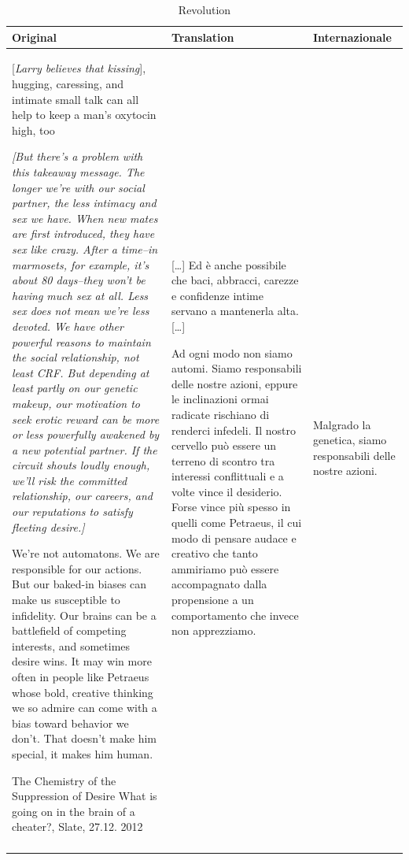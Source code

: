 \documentclass[output=paper]{LSP/langsci}
\begin{document}
\begin{table}
 \tiny
 \caption{Revolution}
 \label{troqe-marchan:tab:2}
\begin{tabularx}{\textwidth}{p{5cm}XX}
\lsptoprule
 Original & Translation & Internazionale \\
 \midrule{}
 [\textit{Larry believes that kissing}], hugging, caressing, and intimate small talk can all help to keep a man's oxytocin high, too

{\itshape [But there's a problem with this takeaway message. The longer we're with our social partner, the less intimacy and sex we have. When new mates are first introduced, they have sex like crazy. After a time--in marmosets, for example, it's about 80 days--they won't be having much sex at all.
Less sex does not mean we're less devoted. We have other powerful reasons to maintain the social relationship, not least CRF. But depending at least partly on our genetic makeup, our motivation to seek erotic reward can be more or less powerfully awakened by a new potential partner. If the circuit shouts loudly enough, we'll risk the committed relationship, our careers, and our reputations to satisfy fleeting desire.]}

We're not automatons. We are responsible for our actions. But our baked-in biases can make us susceptible to infidelity. Our brains can be a battlefield of competing interests, and sometimes desire wins. It may win more often in people like Petraeus whose bold, creative thinking we so admire can come with a bias toward behavior we don't. That doesn't make him special, it makes him human.

The Chemistry of the Suppression of Desire What is going on in the brain of a cheater?, Slate, 27.12. 2012 & 
[\ldots] Ed è anche possibile che baci, abbracci, carezze e confidenze intime servano a mantenerla alta. [\ldots]

Ad ogni modo non siamo automi. Siamo responsabili delle nostre azioni, eppure le inclinazioni ormai radicate rischiano di renderci infedeli. Il nostro cervello può essere un terreno di scontro tra interessi conflittuali e a volte vince il desiderio. Forse vince più spesso in quelli come Petraeus, il cui modo di pensare audace e creativo che tanto ammiriamo può essere accompagnato dalla propensione a un comportamento che invece non apprezziamo. & 
Malgrado la genetica, siamo responsabili delle nostre azioni. \\
\lspbottomrule
\end{tabularx}
\end{table}
\end{document}
